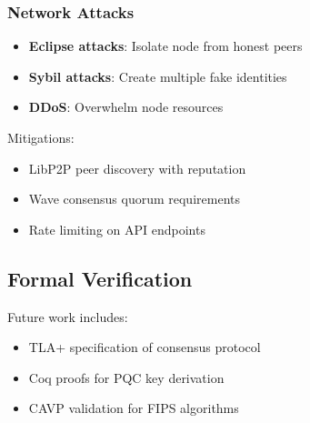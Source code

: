 \subsubsection{Network Attacks}

\begin{itemize}
\item \textbf{Eclipse attacks}: Isolate node from honest peers
\item \textbf{Sybil attacks}: Create multiple fake identities
\item \textbf{DDoS}: Overwhelm node resources
\end{itemize}

Mitigations:
\begin{itemize}
\item LibP2P peer discovery with reputation
\item Wave consensus quorum requirements
\item Rate limiting on API endpoints
\end{itemize}

\subsection{Formal Verification}

Future work includes:
\begin{itemize}
\item TLA+ specification of consensus protocol
\item Coq proofs for PQC key derivation
\item CAVP validation for FIPS algorithms
\end{itemize}

